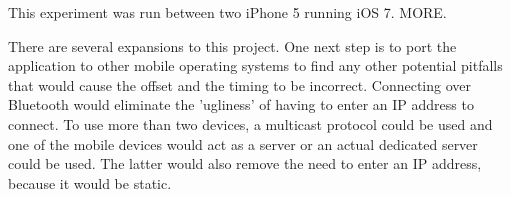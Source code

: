 \documentclass[10pt]{IEEEtran}
\begin{document}
This experiment was run between two iPhone 5 running iOS 7. MORE.

There are several expansions to this project. One next step is to port the 
application to other mobile operating systems to find any other potential 
pitfalls that would cause the offset and the timing to be incorrect. Connecting
over Bluetooth would eliminate the 'ugliness' of having to enter an IP address
to connect. To use more than two devices, a multicast protocol could be used and
one of the mobile devices would act as a server or an actual dedicated server
could be used. The latter would also remove the need to enter an IP address,
because it would be static. 

\begin{thebibliography}{1}



\end{thebibliography}
\end{document}
